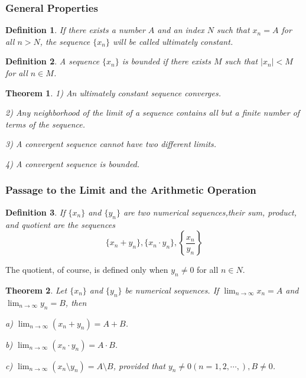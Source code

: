 \documentclass[a4paper,12pt]{article} %
\newtheorem{definition}{Definition}[section]
\newtheorem{theorem}{Theorem}[section]
\begin{document}
\subsubsection{General Properties}
\begin{definition}
    If there exists a number $A$ and an index $N$ such that $x_n = A$
    for all $n>N$, the sequence $\{x_n\}$ will be called ultimately 
    constant.
\end{definition}
\begin{definition}
    A sequence $\{x_n\}$ is bounded if there exists $M$ such that $|x_n| < M$
    for all $n \in M$.
\end{definition}

\begin{theorem}
    1) An ultimately constant sequence converges.

    2) Any neighborhood of the limit of a sequence contains all but 
    a finite number of terms of the sequence.

    3) A convergent sequence cannot have two different limits.

    4) A convergent sequence is bounded.
\end{theorem}

\subsubsection{Passage to the Limit and the Arithmetic Operation}
\begin{definition}
    If $\{x_n\}$ and $\{y_n\}$ are two numerical sequences,their sum, 
    product, and quotient are the sequences
    \[\{x_n+y_n\}, \{x_n \cdot y_n\}, \left\{\frac{x_n}{y_n}\right\}\]
\end{definition}
The quotient, of course, is defined only when $y_n\ne 0$ for all $n \in N$.

\begin{theorem}
    Let $\{x_n\}$ and $\{y_n\}$ be numerical sequences. If $\displaystyle \lim_{n\to \infty}
    x_n =A$ and $\displaystyle \lim_{n\to \infty} y_n =B$, then 

    {\rm a)} $\displaystyle \lim_{n\to \infty}\left(x_n+y_n \right) = A+B$.
    
    {\rm b)} $\displaystyle \lim_{n\to \infty}\left(x_n \cdot y_n \right) = A \cdot B$.

    {\rm c)} $\displaystyle \lim_{n\to \infty}\left(x_n \setminus y_n \right) = A \setminus B$,
    provided that $y_n \ne 0 (n=1,2,\cdots,),B\ne0$.
\end{theorem}
\end{document}
